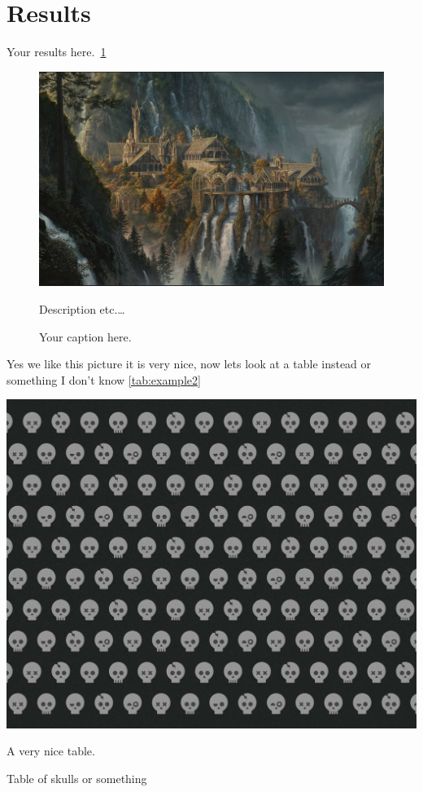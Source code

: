 \section{Results}
Your results here.\ \cref{fig:example1}
\begin{figure}[H]
	\centering
	\includegraphics[width=1\textwidth]{../images/614690.jpg}
	\caption{Your caption here.}
	Description etc.\ldots
	\label{fig:example1}
\end{figure}

Yes we like this picture it is very nice, now lets look at a table instead or something I don't know \cref{tab:example2}

\begin{table}[H]
	\centering
	\includegraphics[width=1\textwidth]{../images/1475939459162.jpg}
	\caption{A very nice table.}
	\label{tab:example2}Table of skulls or something
\end{table}